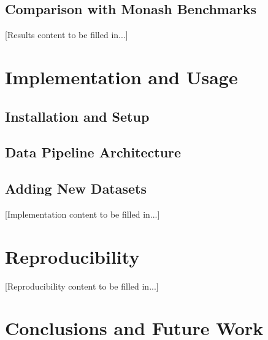\documentclass{article}
\begin{document}
\subsection{Comparison with Monash Benchmarks}

[Results content to be filled in...]

\section{Implementation and Usage}
\label{sec:implementation}


\subsection{Installation and Setup}

\subsection{Data Pipeline Architecture}

\subsection{Adding New Datasets}

[Implementation content to be filled in...]

\section{Reproducibility}
\label{sec:reproducibility}


[Reproducibility content to be filled in...]

\section{Conclusions and Future Work}
\label{sec:conclusion}
\end{document}
